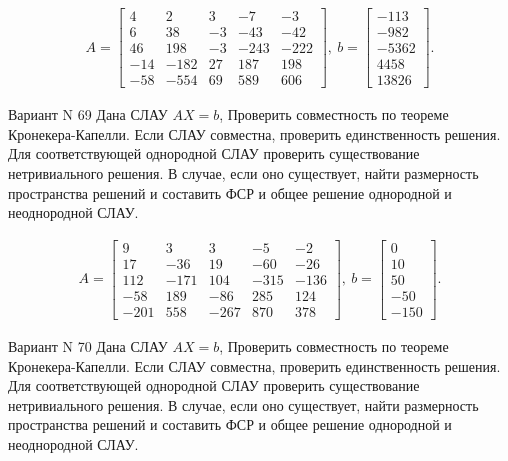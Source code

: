\documentclass[11pt]{report}
\begin{document}
\begin{align*}
 A = \left[\begin{matrix}4 & 2 & 3 & -7 & -3\\6 & 38 & -3 & -43 & -42\\46 & 198 & -3 & -243 & -222\\-14 & -182 & 27 & 187 & 198\\-58 & -554 & 69 & 589 & 606\end{matrix}\right],
\ b = \left[\begin{matrix}-113\\-982\\-5362\\4458\\13826\end{matrix}\right]. 
 \end{align*}

Вариант N 69
Дана СЛАУ $AX = b$,
Проверить совместность по теореме Кронекера-Капелли. Если СЛАУ совместна, проверить единственность решения.
Для соответствующей однородной СЛАУ проверить существование нетривиального решения. В случае, если оно существует,
найти размерность пространства решений и составить ФСР и общее решение однородной  и неоднородной СЛАУ.


\begin{align*}
 A = \left[\begin{matrix}9 & 3 & 3 & -5 & -2\\17 & -36 & 19 & -60 & -26\\112 & -171 & 104 & -315 & -136\\-58 & 189 & -86 & 285 & 124\\-201 & 558 & -267 & 870 & 378\end{matrix}\right],
\ b = \left[\begin{matrix}0\\10\\50\\-50\\-150\end{matrix}\right]. 
 \end{align*}

Вариант N 70
Дана СЛАУ $AX = b$,
Проверить совместность по теореме Кронекера-Капелли. Если СЛАУ совместна, проверить единственность решения.
Для соответствующей однородной СЛАУ проверить существование нетривиального решения. В случае, если оно существует,
найти размерность пространства решений и составить ФСР и общее решение однородной  и неоднородной СЛАУ.
\end{document}
